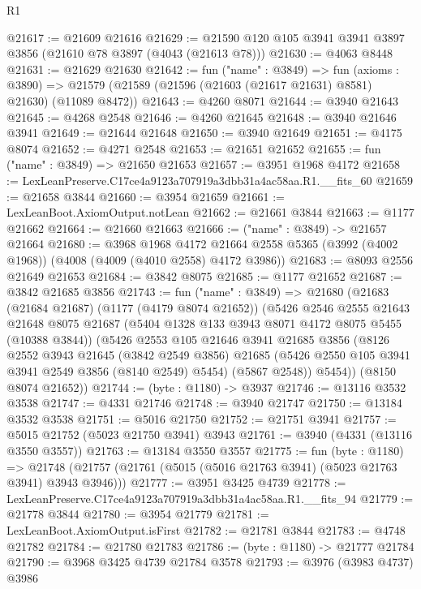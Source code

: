 \begin{lexlean}{R1}
\begin{coremodule}
@21617 := @21609 @21616
@21629 := @21590 @120 @105 @3941 @3941 @3897 @3856 (@21610 @78 @3897 (@4043 (@21613 @78)))
@21630 := @4063 @8448
@21631 := @21629 @21630
@21642 := fun ("name" : @3849) =>
  fun (axioms : @3890) =>
  @21579 (@21589 (@21596 (@21603 (@21617 @21631) @8581) @21630) (@11089 @8472))
@21643 := @4260 @8071
@21644 := @3940 @21643
@21645 := @4268 @2548
@21646 := @4260 @21645
@21648 := @3940 @21646 @3941
@21649 := @21644 @21648
@21650 := @3940 @21649
@21651 := @4175 @8074
@21652 := @4271 @2548
@21653 := @21651 @21652
@21655 := fun ("name" : @3849) => @21650 @21653
@21657 := @3951 @1968 @4172
@21658 := LexLeanPreserve.C17ce4a9123a707919a3dbb31a4ac58aa.R1.__fits_60
@21659 := @21658 @3844
@21660 := @3954 @21659
@21661 := LexLeanBoot.AxiomOutput.notLean
@21662 := @21661 @3844
@21663 := @1177 @21662
@21664 := @21660 @21663
@21666 := ("name" : @3849) -> @21657 @21664
@21680 := @3968
    @1968
    @4172
    @21664
    @2558
    @5365
    (@3992 (@4002 @1968))
    (@4008 (@4009 (@4010 @2558) @4172 @3986))
@21683 := @8093 @2556 @21649 @21653
@21684 := @3842 @8075
@21685 := @1177 @21652
@21687 := @3842 @21685 @3856
@21743 := fun ("name" : @3849) =>
  @21680
    (@21683
      (@21684 @21687)
      (@1177 (@4179 @8074 @21652))
      (@5426
        @2546
        @2555
        @21643
        @21648
        @8075
        @21687
        (@5404 @1328 @133 @3943 @8071 @4172 @8075 @5455 (@10388 @3844))
        (@5426
          @2553
          @105
          @21646
          @3941
          @21685
          @3856
          (@8126
            @2552
            @3943
            @21645
            (@3842 @2549 @3856)
            @21685
            (@5426 @2550 @105 @3941 @3941 @2549 @3856 (@8140 @2549) @5454)
            (@5867 @2548))
          @5454))
      (@8150 @8074 @21652))
@21744 := (byte : @1180) -> @3937
@21746 := @13116 @3532 @3538
@21747 := @4331 @21746
@21748 := @3940 @21747
@21750 := @13184 @3532 @3538
@21751 := @5016 @21750
@21752 := @21751 @3941
@21757 := @5015 @21752 (@5023 @21750 @3941) @3943
@21761 := @3940 (@4331 (@13116 @3550 @3557))
@21763 := @13184 @3550 @3557
@21775 := fun (byte : @1180) =>
  @21748 (@21757 (@21761 (@5015 (@5016 @21763 @3941) (@5023 @21763 @3941) @3943 @3946)))
@21777 := @3951 @3425 @4739
@21778 := LexLeanPreserve.C17ce4a9123a707919a3dbb31a4ac58aa.R1.__fits_94
@21779 := @21778 @3844
@21780 := @3954 @21779
@21781 := LexLeanBoot.AxiomOutput.isFirst
@21782 := @21781 @3844
@21783 := @4748 @21782
@21784 := @21780 @21783
@21786 := (byte : @1180) -> @21777 @21784
@21790 := @3968 @3425 @4739 @21784 @3578
@21793 := @3976 (@3983 @4737) @3986

\end{coremodule}
\end{lexlean}
